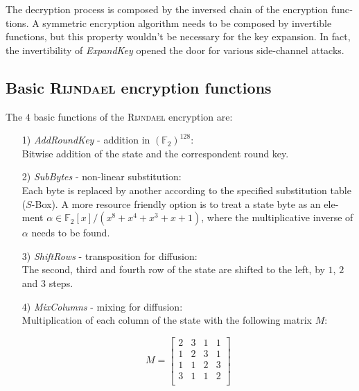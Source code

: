 \documentclass[a4paper,11pt]{article}
\begin{document}
\begin{otherlanguage}{english}
\noindent
The decryption process is composed by the inversed chain of the encryption functions. A symmetric encryption algorithm needs to be composed by invertible functions, but this property wouldn't be necessary for the key expansion. In fact, the invertibility of \textit{ExpandKey} opened the door for various side-channel attacks. 

\subsection{Basic \textsc{Rijndael} encryption functions}
The $4$ basic functions of the \textsc{Rijndael} encryption are: \\

\begin{itemize} [noitemsep, nolistsep]
  \item[1)] \textit{AddRoundKey} - addition in ${(\mathbb{F}_2)}^{128}$: \\ 
  Bitwise addition of the state and the correspondent round key.
  \vspace{0.1cm}

  \item[2)] \textit{SubBytes} - non-linear substitution: \\
  Each byte is replaced by another according to the specified substitution table ($S$-Box). A more resource friendly option is to treat a state byte as an element $\alpha \in \mathbb{F}_2 [x]/(x^8 + x^4 + x^3 + x + 1)$, where the multiplicative inverse of $\alpha$ needs to be found.
  \vspace{0.1cm}

  \item[3)] \textit{ShiftRows} - transposition for diffusion: \\
  The second, third and fourth row of the state are shifted to the left, by $1$, $2$ and $3$ steps.
  \vspace{0.1cm}

  \item[4)] \textit{MixColumns} - mixing for diffusion: \\
  Multiplication of each column of the state with the following matrix $M$:

  $$ 
  	M = 
  	\begin{bmatrix}
  		2 & 3 & 1 & 1 \\ 
  	 	1 & 2 & 3 & 1 \\
  	 	1 & 1 & 2 & 3 \\
  	 	3 & 1 & 1 & 2 \\
  	\end{bmatrix}
  $$


\end{itemize}
\end{otherlanguage}
\end{document}
